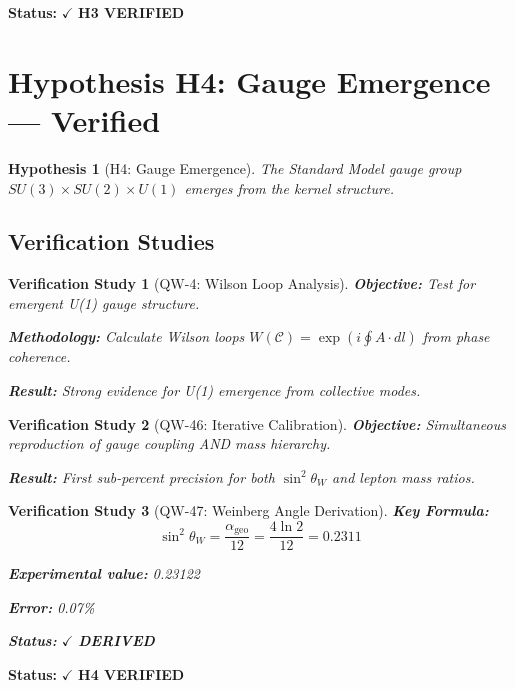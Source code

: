 \documentclass[11pt, a4paper]{article}
\newtheorem{hypothesis}{Hypothesis}[section]
\newtheorem{verification}{Verification Study}[section]
\theoremstyle{remark}
\newcommand{\alphageo}{\alpha_{\text{geo}}}
\begin{document}
\textbf{Status:} $\checkmark$ \textbf{H3 VERIFIED}

\section{Hypothesis H4: Gauge Emergence --- Verified}

\begin{hypothesis}[H4: Gauge Emergence]
The Standard Model gauge group $SU(3) \times SU(2) \times U(1)$ emerges from the kernel structure.
\end{hypothesis}

\subsection{Verification Studies}

\begin{verification}[QW-4: Wilson Loop Analysis]
\textbf{Objective:} Test for emergent U(1) gauge structure.

\textbf{Methodology:} Calculate Wilson loops $W(\mathcal{C}) = \exp(i\oint A \cdot dl)$ from phase coherence.

\textbf{Result:} Strong evidence for U(1) emergence from collective modes.
\end{verification}

\begin{verification}[QW-46: Iterative Calibration]
\textbf{Objective:} Simultaneous reproduction of gauge coupling AND mass hierarchy.

\textbf{Result:} First sub-percent precision for both $\sin^2\theta_W$ and lepton mass ratios.
\end{verification}

\begin{verification}[QW-47: Weinberg Angle Derivation]
\textbf{Key Formula:}
\begin{equation}
\sin^2\theta_W = \frac{\alphageo}{12} = \frac{4\ln 2}{12} = 0.2311
\end{equation}

\textbf{Experimental value:} 0.23122

\textbf{Error:} 0.07\%

\textbf{Status:} $\checkmark$ \textbf{DERIVED}
\end{verification}

\textbf{Status:} $\checkmark$ \textbf{H4 VERIFIED}

\end{document}
